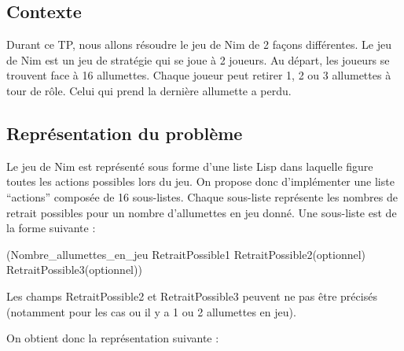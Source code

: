 \documentclass[
]{article}
\newenvironment{Shaded}{}{}
\newcommand{\NormalTok}[1]{#1}
\begin{document}
\hypertarget{contexte}{%
\subsection{Contexte}\label{contexte}}

Durant ce TP, nous allons résoudre le jeu de Nim de 2 façons
différentes. Le jeu de Nim est un jeu de stratégie qui se joue à 2
joueurs. Au départ, les joueurs se trouvent face à 16 allumettes. Chaque
joueur peut retirer 1, 2 ou 3 allumettes à tour de rôle. Celui qui prend
la dernière allumette a perdu.

\hypertarget{repruxe9sentation-du-probluxe8me}{%
\subsection{Représentation du
problème}\label{repruxe9sentation-du-probluxe8me}}

Le jeu de Nim est représenté sous forme d'une liste Lisp dans laquelle
figure toutes les actions possibles lors du jeu. On propose donc
d'implémenter une liste ``actions'' composée de 16 sous-listes. Chaque
sous-liste représente les nombres de retrait possibles pour un nombre
d'allumettes en jeu donné. Une sous-liste est de la forme suivante :

\begin{Shaded}
\begin{Highlighting}[]
\NormalTok{(Nombre\_allumettes\_en\_jeu RetraitPossible1 RetraitPossible2(optionnel)}
\NormalTok{RetraitPossible3(optionnel))}
\end{Highlighting}
\end{Shaded}

Les champs RetraitPossible2 et RetraitPossible3 peuvent ne pas être
précisés (notamment pour les cas ou il y a 1 ou 2 allumettes en jeu).

On obtient donc la représentation suivante :
\end{document}
